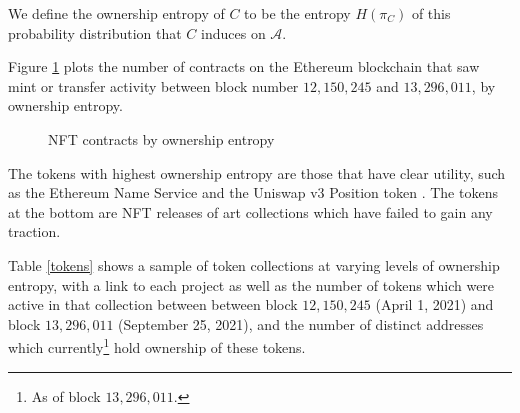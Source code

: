 \documentclass{article}
\begin{document}
We define the ownership entropy of $C$ to be the entropy $H(\pi_C)$ of this probability distribution that $C$ induces on $\mathcal{A}$.

Figure \ref{ownership-entropy} plots the number of contracts on the Ethereum blockchain that saw mint or transfer activity between block number $12,150,245$ and $13,296,011$, by ownership entropy.

\begin{figure}
\caption{NFT contracts by ownership entropy}\label{ownership-entropy}
\end{figure}

The tokens with highest ownership entropy are those that have clear utility, such as the
Ethereum Name Service \cite{ens} and the Uniswap v3 Position token \cite{uniswap-v3}. The tokens at the bottom are NFT releases of art collections which have failed to gain any traction.

Table \ref{tokens} shows a sample of token collections at varying levels of ownership entropy, with a link to each project as well as the number of tokens which were active in that collection between between block $12,150,245$ (April 1, 2021) and block $13,296,011$ (September 25, 2021), and the number of distinct addresses which currently\footnote{As of block $13,296,011$.} hold ownership of these tokens.

\begin{table}
\caption{A sample of tokens at varying levels of ownership spread}\label{tokens}
\end{table}
\end{document}
